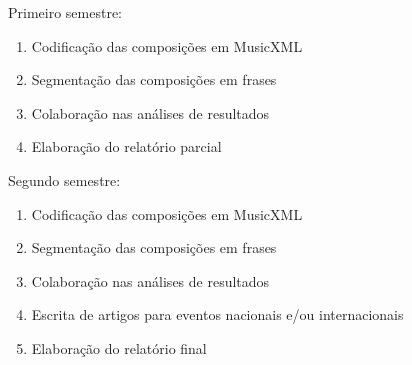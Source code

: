 \documentclass[11pt]{article}
\begin{document}
Primeiro semestre:
\begin{enumerate}
\item Codificação das composições em MusicXML
\item Segmentação das composições em frases
\item Colaboração nas análises de resultados
\item Elaboração do relatório parcial
\end{enumerate}

Segundo semestre:
\begin{enumerate}
\item Codificação das composições em MusicXML
\item Segmentação das composições em frases
\item Colaboração nas análises de resultados
\item Escrita de artigos para eventos nacionais e/ou internacionais
\item Elaboração do relatório final
\end{enumerate}
\end{document}
